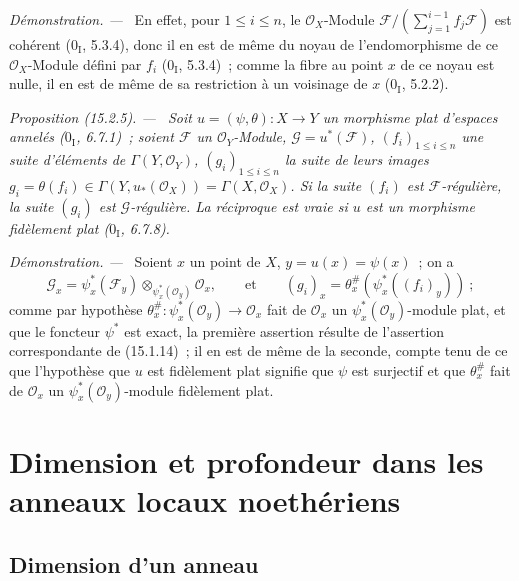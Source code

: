\documentclass[10pt,oneside]{book}
\makeatletter
\newcommand{\setmanualcurrentlabel}[1]{\def\@currentlabel{#1}}
\newcommand{\oldpage}[2][]{%
  \setcounter{footnote}{0}%
  \marginpar{\scriptsize\textbf{#1}~|~#2}\ignorespaces}
\newenvironment{proposition}[1][]{%
  \setmanualcurrentlabel{#1}\par\medskip\noindent\itshape Proposition (#1). ---\ }{\par}
\newenvironment{proof}{%
  \par\medskip\noindent\textit{Démonstration. ---\ }}{\par}
\makeatother
\begin{document}
\begin{proof}
En effet, pour $1\leq i\leq n$, le $\mathcal{O}_X$-Module
$\mathscr{F}/(\sum_{j=1}^{i-1}f_j\mathscr{F})$ est cohérent
($0_{\mathrm I}$, 5.3.4), donc il en est de même du noyau de
l'endomorphisme de ce $\mathcal{O}_X$-Module défini par $f_i$
($0_{\mathrm I}$, 5.3.4)~; comme la fibre au point $x$ de ce noyau est nulle,
il en est de même de sa restriction à un voisinage de $x$
($0_{\mathrm I}$, 5.2.2).
\end{proof}

\begin{proposition}[15.2.5]
\label{0.15.2.5-fr}
\oldpage[0\textsubscript{IV-1}]{22}
Soit $u=(\psi,\theta):X\to Y$ un morphisme plat d'espaces annelés
($0_{\mathrm I}$, 6.7.1)~; soient $\mathscr{F}$ un
$\mathcal{O}_Y$-Module, $\mathscr{G}=u^*(\mathscr{F})$,
$(f_i)_{1\leq i\leq n}$ une suite d'éléments de
$\Gamma(Y,\mathcal{O}_Y)$, $(g_i)_{1\leq i\leq n}$ la suite de leurs images
$g_i=\theta(f_i)\in\Gamma(Y,u_*(\mathcal{O}_X))=\Gamma(X,\mathcal{O}_X)$. Si
la suite $(f_i)$ est $\mathscr{F}$-régulière, la suite $(g_i)$ est
$\mathscr{G}$-régulière. La réciproque est vraie si $u$ est un morphisme
fidèlement plat ($0_{\mathrm I}$, 6.7.8).
\end{proposition}

\begin{proof}
Soient $x$ un point de $X$, $y=u(x)=\psi(x)$~; on a
\[
  \mathscr{G}_x=\psi_x^*(\mathscr{F}_y)
  \otimes_{\psi_x^*(\mathcal{O}_y)}\mathcal{O}_x,
  \qquad\text{et}\qquad
  (g_i)_x=\theta_x^\#(\psi_x^*((f_i)_y))~;
\]
comme par hypothèse
$\theta_x^\#:\psi_x^*(\mathcal{O}_y)\to\mathcal{O}_x$ fait de
$\mathcal{O}_x$ un $\psi_x^*(\mathcal{O}_y)$-module plat, et que le foncteur
$\psi^*$ est exact, la première assertion résulte de l'assertion correspondante
de (15.1.14)~; il en est de même de la seconde, compte tenu de ce que
l'hypothèse que $u$ est fidèlement plat signifie que $\psi$ est surjectif et
que $\theta_x^\#$ fait de $\mathcal{O}_x$ un
$\psi_x^*(\mathcal{O}_y)$-module fidèlement plat.
\end{proof}


%
\section{Dimension et profondeur dans les anneaux locaux noethériens}
\label{section:0.16-fr}

\subsection{Dimension d'un anneau}
\label{subsection:0.16.1-fr}
\end{document}
